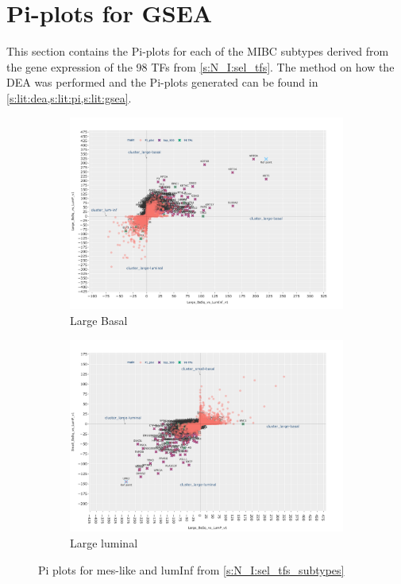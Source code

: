 \section{Pi-plots for GSEA} \label{s:ap:sel_prun_pi}

This section contains the Pi-plots for each of the MIBC subtypes derived from the gene expression of the 98 TFs from \cref{s:N_I:sel_tfs}. The method on how the DEA was performed and the Pi-plots generated can be found in \cref{s:lit:dea,s:lit:pi,s:lit:gsea}.


\begin{figure}[H]
    \centering
    \begin{subfigure}[!t]{1.0\linewidth}
        \includegraphics[width=\textwidth,keepaspectratio]{Sections/Network_I/Resources/selective_pruning/pi_gsea/pi_largeBasal.png}
        \caption{Large Basal}
        \label{fig:ap:pi_basal}
    \end{subfigure}
    \begin{subfigure}[!t]{1.0\textwidth}
        \includegraphics[width=\textwidth,keepaspectratio]{Sections/Network_I/Resources/selective_pruning/pi_gsea/pi_largeLuminal.png}
        \caption{Large luminal}
        \label{fig:ap:pi_lum}
    \end{subfigure}
    \caption{Pi plots for mes-like and lumInf from \cref{s:N_I:sel_tfs_subtypes}}
    \label{fig:ap:pi_other_values_I}
\end{figure}

